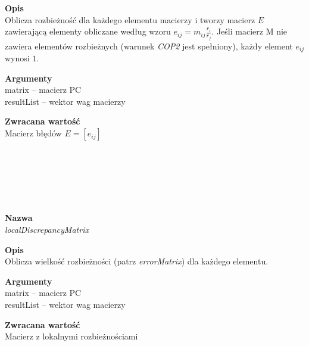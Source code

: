 \begin{spacing}{1.1}
\begin{spacing}{1.1}
\begin{spacing}{1.1}
\begin{spacing}{1.2}
\begin{spacing}{1.1}
\begin{spacing}{1.2}
\begin{spacing}{1.2}
\textbf{Opis}\\ Oblicza rozbieżność dla każdego elementu macierzy i tworzy macierz $E$ zawierającą elementy obliczane według wzoru $e_{ij} = m_{ij}\frac{r_i}{r_j}$. Jeśli macierz M nie zawiera elementów rozbieżnych (warunek \textit{COP2} jest spełniony), każdy element $e_{ij}$ wynosi $1$. \\  \begin{spacing}{0.3}  \end{spacing}
 
\textbf{Argumenty} \\
matrix -- macierz PC \\ 
resultList -- wektor wag macierzy \\  \begin{spacing}{0.3}  \end{spacing}

\textbf{Zwracana wartość}\\ Macierz błędów $E=[e_{ij}]$ \end{spacing}\\

\\~\\
\begin{spacing}{1.2}
 \\ \begin{spacing}{0.5}  \end{spacing}

\textbf{Nazwa}\\  \emph{localDiscrepancyMatrix} \\ \begin{spacing}{0.3}  \end{spacing}
 
\textbf{Opis}\\ Oblicza wielkość rozbieżności (patrz \textit{errorMatrix}) dla każdego elementu. \\  \begin{spacing}{0.3}  \end{spacing}
 
\textbf{Argumenty} \\
matrix -- macierz PC \\
resultList -- wektor wag macierzy \\  \begin{spacing}{0.3}  \end{spacing}

\textbf{Zwracana wartość}\\ Macierz z lokalnymi rozbieżnościami \end{spacing}\\



\end{spacing}
\end{spacing}
\end{spacing}
\end{spacing}
\end{spacing}
\end{spacing}
